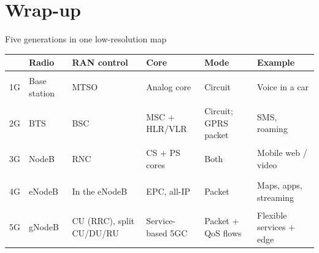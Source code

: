 
\section[Wrap-up]{Wrap-up}


\begin{frame}{Five generations in one low-resolution map}
  \vspace{0.3em}
  \centering
  \scriptsize
  \setlength{\tabcolsep}{3pt}
  \renewcommand{\arraystretch}{1.32}
  \begin{tabular}{>{\bfseries\raggedright\arraybackslash}p{0.45cm}
      >{\raggedright\arraybackslash}p{1.45cm}
      >{\raggedright\arraybackslash}p{1.55cm}
      >{\raggedright\arraybackslash}p{2.30cm}
      >{\raggedright\arraybackslash}p{1.30cm}
      >{\raggedright\arraybackslash}p{2.40cm}}
    \toprule
    & \textbf{Radio} & \textbf{RAN control} & \textbf{Core} & \textbf{Mode} & \textbf{Example} \\
    \midrule
    1G & Base station & MTSO & Analog core & Circuit & Voice in a car \\
    2G & BTS & BSC & MSC + HLR/VLR & Circuit; GPRS packet & SMS, roaming \\
    3G & NodeB & RNC & CS + PS cores & Both & Mobile web / video \\
    4G & eNodeB & In the eNodeB & EPC, all-IP & Packet & Maps, apps, streaming \\
    5G & gNodeB & CU (RRC), split CU/DU/RU & Service-based 5GC & Packet + QoS flows & Flexible services + edge \\
    \bottomrule
  \end{tabular}


  \vspace{0.5em}
\end{frame}

